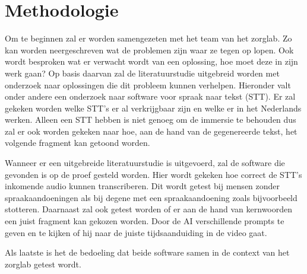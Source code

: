 
\section{Methodologie}%
\label{sec:methodologie}

Om te beginnen zal er worden samengezeten met het team van het zorglab. Zo kan worden neergeschreven wat de problemen zijn waar ze tegen op lopen. Ook wordt besproken wat er verwacht wordt van een oplossing, hoe moet deze in zijn werk gaan? Op basis daarvan zal de literatuurstudie uitgebreid worden met onderzoek naar oplossingen die dit probleem kunnen verhelpen. Hieronder valt onder andere een onderzoek naar software voor spraak naar tekst (STT). Er zal gekeken worden welke STT's er al verkrijgbaar zijn en welke er in het Nederlands werken. Alleen een STT hebben is niet genoeg om de immersie te behouden dus zal er ook worden gekeken naar hoe, aan de hand van de gegenereerde tekst, het volgende fragment kan getoond worden.

Wanneer er een uitgebreide literatuurstudie is uitgevoerd, zal de software die gevonden is op de proef gesteld worden. Hier wordt gekeken hoe correct de STT's inkomende audio kunnen transcriberen. Dit wordt getest bij mensen zonder spraakaandoeningen als bij degene met een spraakaandoening zoals bijvoorbeeld stotteren. Daarnaast zal ook getest worden of er aan de hand van kernwoorden een juist fragment kan gekozen worden. Door de AI verschillende prompts te geven en te kijken of hij naar de juiste tijdsaanduiding in de video gaat.

Als laatste is het de bedoeling dat beide software samen in de context van het zorglab getest wordt.

